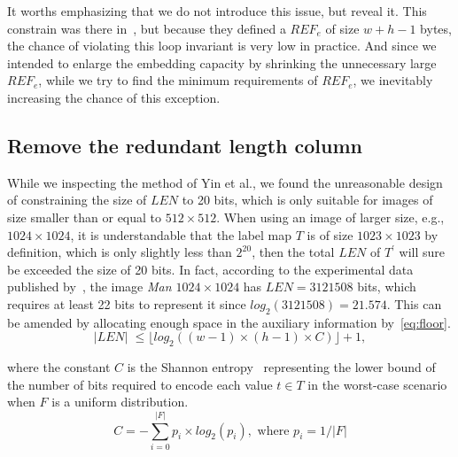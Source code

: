It worths emphasizing that we do not introduce this issue, but reveal it. 
This constrain was there in~\cite{Yin2020}, but because they defined a $REF_e$ of size $w + h - 1$ bytes, the chance of violating this loop invariant is very low in practice.
And since we intended to enlarge the embedding capacity by shrinking the unnecessary large $REF_e$, while we try to find the minimum requirements of $REF_e$, we inevitably increasing the chance of this exception.


















\subsection{Remove the redundant length column}
\label{sec:improvesize}


While we inspecting the method of Yin et al., we found the unreasonable design of constraining the size of $LEN$ to 20 bits, which is only suitable for images of size smaller than or equal to $512 \times 512$. 
When using an image of larger size, e.g., $1024 \times 1024$, 
it is understandable that the label map $T$ is of size $1023 \times 1023$ by definition, which is only slightly less than $2^{20}$, then the total $LEN$ of $T^\prime$ will sure be exceeded the size of 20 bits. 
In fact, according to the experimental data published by~\cite{Yin2020}, the image \emph{Man $1024 \times 1024$} has $LEN = 3121508$ bits, which requires at least 22 bits to represent it since $log_2(3121508) = 21.574$.
This can be amended by allocating enough space in the auxiliary information by~\eqref{eq:floor}.
\begin{equation}
	\label{eq:floor}
	\vert LEN \vert \; \leq \lfloor log_2((w - 1) \times (h - 1) \times C ) \rfloor + 1 , 
\end{equation}

where the constant $C$ is the Shannon entropy~\cite{Shannon1948} representing the lower bound of the number of bits required to encode each value $t \in T$ 
in the worst-case scenario when $F$ is a uniform distribution.
\begin{equation}
	C = - \sum_{i = 0}^{\vert F \vert} p_i \times log_2 (p_i), \text{ where } p_i = 1 / {\vert F \vert}
\end{equation}

